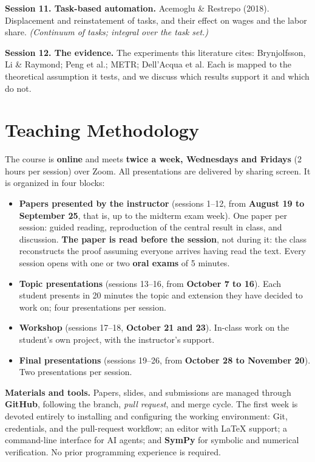 \documentclass[11pt]{article}
\begin{document}
\textbf{Session 11. Task-based automation.}
Acemoglu \& Restrepo (2018). Displacement and reinstatement of tasks, and their effect on wages and the labor share.
\emph{(Continuum of tasks; integral over the task set.)}

\textbf{Session 12. The evidence.}
The experiments this literature cites: Brynjolfsson, Li \& Raymond; Peng et al.; METR; Dell'Acqua et al. Each is mapped to the theoretical assumption it tests, and we discuss which results support it and which do not.

\section{Teaching Methodology}

The course is \textbf{online} and meets \textbf{twice a week, Wednesdays and Fridays} (2 hours per session) over Zoom. All presentations are delivered by sharing screen. It is organized in four blocks:

\begin{itemize}
\item \textbf{Papers presented by the instructor} (sessions 1--12, from \textbf{August 19 to September 25}, that is, up to the midterm exam week). One paper per session: guided reading, reproduction of the central result in class, and discussion. \textbf{The paper is read before the session}, not during it: the class reconstructs the proof assuming everyone arrives having read the text. Every session opens with one or two \textbf{oral exams} of 5 minutes.
\item \textbf{Topic presentations} (sessions 13--16, from \textbf{October 7 to 16}). Each student presents in 20 minutes the topic and extension they have decided to work on; four presentations per session.
\item \textbf{Workshop} (sessions 17--18, \textbf{October 21 and 23}). In-class work on the student's own project, with the instructor's support.
\item \textbf{Final presentations} (sessions 19--26, from \textbf{October 28 to November 20}). Two presentations per session.
\end{itemize}

\textbf{Materials and tools.} Papers, slides, and submissions are managed through \textbf{GitHub}, following the branch, \emph{pull request}, and merge cycle. The first week is devoted entirely to installing and configuring the working environment: Git, credentials, and the pull-request workflow; an editor with \LaTeX{} support; a command-line interface for AI agents; and \textbf{SymPy} for symbolic and numerical verification. No prior programming experience is required.
\end{document}
